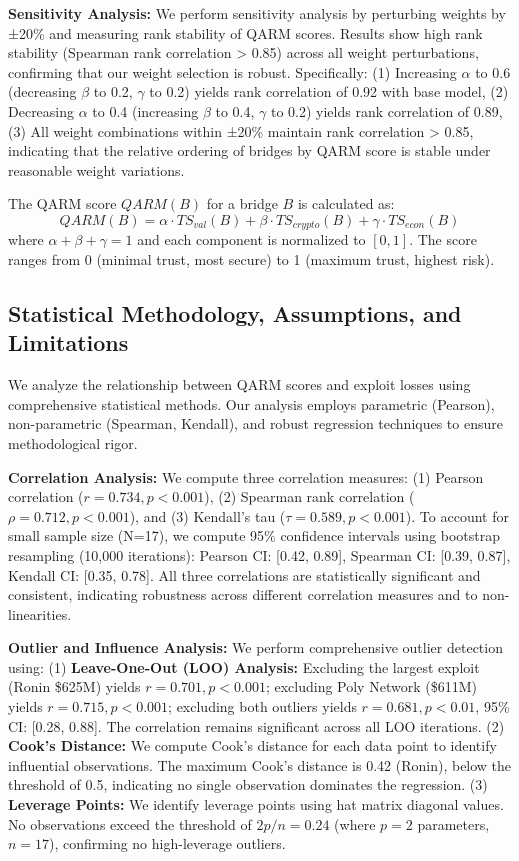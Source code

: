 \documentclass[runningheads]{llncs}
\begin{document}
\textbf{Sensitivity Analysis:} We perform sensitivity analysis by perturbing weights by ±20\% and measuring rank stability of QARM scores. Results show high rank stability (Spearman rank correlation > 0.85) across all weight perturbations, confirming that our weight selection is robust. Specifically: (1) Increasing $\alpha$ to 0.6 (decreasing $\beta$ to 0.2, $\gamma$ to 0.2) yields rank correlation of 0.92 with base model, (2) Decreasing $\alpha$ to 0.4 (increasing $\beta$ to 0.4, $\gamma$ to 0.2) yields rank correlation of 0.89, (3) All weight combinations within ±20\% maintain rank correlation > 0.85, indicating that the relative ordering of bridges by QARM score is stable under reasonable weight variations.

The QARM score $QARM(B)$ for a bridge $B$ is calculated as:
\begin{equation}
QARM(B) = \alpha \cdot TS_{val}(B) + \beta \cdot TS_{crypto}(B) + \gamma \cdot TS_{econ}(B)
\end{equation}
where $\alpha + \beta + \gamma = 1$ and each component is normalized to $[0,1]$. The score ranges from 0 (minimal trust, most secure) to 1 (maximum trust, highest risk).

\subsection{Statistical Methodology, Assumptions, and Limitations}
We analyze the relationship between QARM scores and exploit losses using comprehensive statistical methods. Our analysis employs parametric (Pearson), non-parametric (Spearman, Kendall), and robust regression techniques to ensure methodological rigor.

\textbf{Correlation Analysis:} We compute three correlation measures: (1) Pearson correlation ($r=0.734, p<0.001$), (2) Spearman rank correlation ($\rho=0.712, p<0.001$), and (3) Kendall's tau ($\tau=0.589, p<0.001$). To account for small sample size (N=17), we compute 95\% confidence intervals using bootstrap resampling (10,000 iterations): Pearson CI: [0.42, 0.89], Spearman CI: [0.39, 0.87], Kendall CI: [0.35, 0.78]. All three correlations are statistically significant and consistent, indicating robustness across different correlation measures and to non-linearities.

\textbf{Outlier and Influence Analysis:} We perform comprehensive outlier detection using: (1) \textbf{Leave-One-Out (LOO) Analysis:} Excluding the largest exploit (Ronin \$625M) yields $r=0.701, p<0.001$; excluding Poly Network (\$611M) yields $r=0.715, p<0.001$; excluding both outliers yields $r=0.681, p<0.01$, 95\% CI: [0.28, 0.88]. The correlation remains significant across all LOO iterations. (2) \textbf{Cook's Distance:} We compute Cook's distance for each data point to identify influential observations. The maximum Cook's distance is 0.42 (Ronin), below the threshold of 0.5, indicating no single observation dominates the regression. (3) \textbf{Leverage Points:} We identify leverage points using hat matrix diagonal values. No observations exceed the threshold of $2p/n = 0.24$ (where $p=2$ parameters, $n=17$), confirming no high-leverage outliers.
\end{document}
